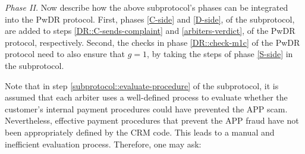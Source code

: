 %
%

%



\noindent\textit{{Phase II.}} Now describe how the  above subprotocol's phases can be integrated into  the PwDR protocol.  First,  phases \ref{C-side} and \ref{D-side},  of the subprotocol, are added to steps \ref{DR::C-sends-complaint} and \ref{arbiters-verdict}, of the PwDR protocol, respectively. Second, the checks in phase \ref{DR::check-m1c}  of the PwDR protocol need to also ensure that $g=1$, by taking the steps of  phase \ref{S-side}   in the subprotocol. 


Note that in step \ref{subprotocol::evaluate-procedure} of the subprotocol, it is assumed that each arbiter uses a well-defined process to evaluate whether the customer's internal payment procedures could have prevented the APP scam. Nevertheless,  effective   payment procedures that  prevent the APP fraud have not been appropriately defined  by the CRM code. This leads to a  manual and inefficient evaluation process.    Therefore, one may ask:







